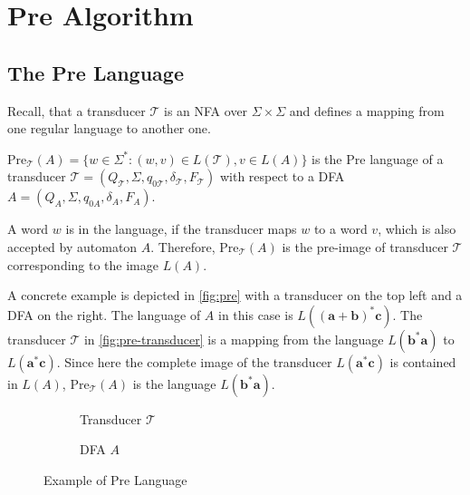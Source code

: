 \section{Pre Algorithm}

\subsection{The Pre Language}\label{sec:pre_theory}
Recall, that a transducer $\mathcal{T}$ is an NFA over $\Sigma \times \Sigma$ and defines a mapping from one regular language to another one.
\begin{definition}\label{def:pre}
$\text{Pre}_{\mathcal{T}}(A) = \{ w \in \Sigma^{*}: (w,v) \in L(\mathcal{T}), v \in L(A) \}$
is the Pre language of a transducer $\mathcal{T} = (Q_{\mathcal{T}},\Sigma,q_{0\mathcal{T}},\delta_{\mathcal{T}},F_{\mathcal{T}})$ with respect to a DFA $A = (Q_{A},\Sigma,q_{0A}, \delta_{A}, F_{A})$. 
\end{definition}

A word $w$ is in the language, if the transducer maps $w$ to a word $v$, which is also accepted by automaton $A$.
Therefore, $\text{Pre}_{\mathcal{T}}(A)$ is the pre-image of transducer $\mathcal{T}$ corresponding to the image $L(A)$. 

\par

A concrete example is depicted in \autoref{fig:pre} with a transducer on the top left and a DFA on the right. The language of $A$ in this case is $L(\bm{(a+b)^{*}c})$. The transducer $\mathcal{T}$ in \autoref{fig:pre-transducer} is a mapping from the language $L(\bm{b^{*}a})$ to $L(\bm{a^{*}c})$. 
Since here the complete image of the transducer $L(\bm{a^{*}c})$ is contained in $L(A)$, $\text{Pre}_{\mathcal{T}}(A)$ is the language $L(\bm{b^{*}a})$. 
\begin{figure}[htb]
\centering 
	\begin{subfigure}{.45\textwidth}	
		\centering 
    	\caption{Transducer $\mathcal{T}$}\label{fig:pre-transducer}
    \end{subfigure}
    \begin{subfigure}{.45\textwidth}
	\centering 
    	\caption{DFA $A$}\label{fig:pre-dfa}
    \end{subfigure}
     \caption{Example of Pre Language}
     \label{fig:pre}
\end{figure}

